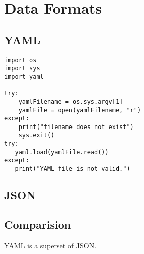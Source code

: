 \chapter{Data Formats}

\section{YAML}


\begin{lstlisting}
import os
import sys
import yaml

try:
    yamlFilename = os.sys.argv[1]
    yamlFile = open(yamlFilename, "r")
except:
    print("filename does not exist")
    sys.exit()
try:
   yaml.load(yamlFile.read())
except:
   print("YAML file is not valid.")
\end{lstlisting}


\section{JSON}



\section{Comparision}


YAML is a superset of JSON. 

